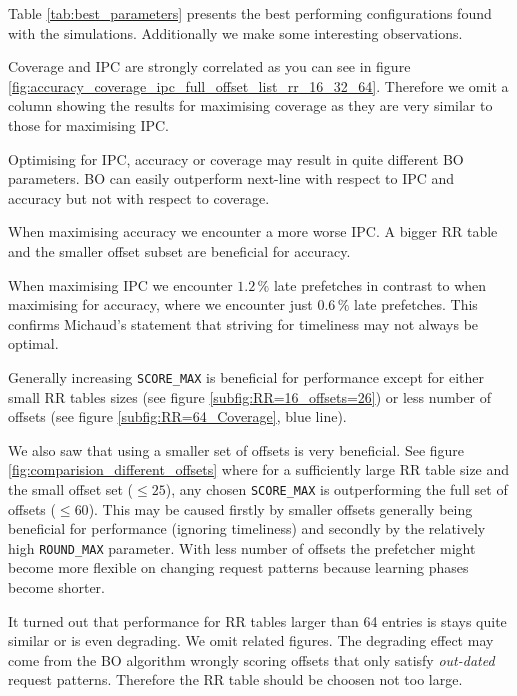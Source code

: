 \documentclass[conference]{IEEEtran}
\begin{document}
Table \ref{tab:best_parameters} presents the best performing configurations found with the simulations.
Additionally we make some interesting observations.

Coverage and IPC are strongly correlated as you can see in figure \ref{fig:accuracy_coverage_ipc_full_offset_list_rr_16_32_64}.
Therefore we omit a column showing the results for maximising coverage as they are very similar to those for maximising IPC.

Optimising for IPC, accuracy or coverage may result in quite different BO parameters.
BO can easily outperform next-line with respect to IPC and accuracy but not with respect to coverage.

When maximising accuracy we encounter a more worse IPC. A bigger RR table and the smaller offset subset are beneficial for accuracy.

When maximising IPC we encounter $1.2\,\%$ late prefetches  in contrast to when maximising for accuracy, where we encounter just $0.6\,\%$ late prefetches.
This confirms Michaud's statement that striving for timeliness may not always be optimal\cite[section 2.3]{BOP_2015}.

Generally increasing \texttt{SCORE\_MAX} is beneficial for performance except for either small RR tables sizes (see figure \ref{subfig:RR=16_offsets=26}) or less number of offsets (see figure \ref{subfig:RR=64_Coverage}, blue line).


We also saw that using a smaller set of offsets is very beneficial.
See figure \ref{fig:comparision_different_offsets} where for a sufficiently large RR table size and the small offset set ($\leq 25$), any chosen \texttt{SCORE\_MAX} is outperforming the full set of offsets ($\leq 60$).
This may be caused firstly by smaller offsets generally being beneficial for performance (ignoring timeliness) and secondly by the relatively high \texttt{ROUND\_MAX} parameter. With less number of offsets the prefetcher might become more flexible on changing request patterns because learning phases become shorter.

It turned out that performance for RR tables larger than 64 entries is stays quite similar or is even degrading.
We omit related figures.
The degrading effect may come from the BO algorithm wrongly scoring offsets that only satisfy \textit{out-dated} request patterns.
Therefore the RR table should be choosen not too large\cite[section 3.1]{Multi-Lookahead}.
\end{document}

